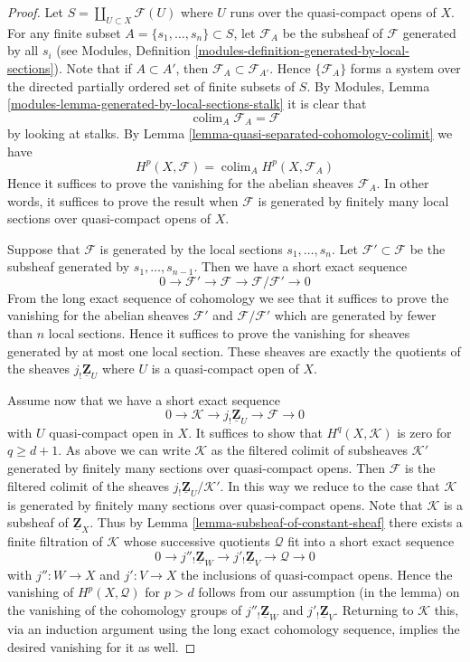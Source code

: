 \documentclass[10pt,a4paper]{amsart}
\theoremstyle{plain}
\theoremstyle{definition}
\theoremstyle{remark}
\numberwithin{equation}{subsection}
\def\colim{\mathop{\mathrm{colim}}\nolimits}
\begin{document}
\begin{proof}
Let $S = \coprod_{U \subset X} \mathcal{F}(U)$ where $U$ runs over the
quasi-compact opens of $X$.
For any finite subset $A = \{s_1, \ldots, s_n\} \subset S$,
let $\mathcal{F}_A$ be the subsheaf of $\mathcal{F}$ generated
by all $s_i$ (see
Modules, Definition \ref{modules-definition-generated-by-local-sections}).
Note that if $A \subset A'$, then $\mathcal{F}_A \subset \mathcal{F}_{A'}$.
Hence $\{\mathcal{F}_A\}$ forms a system over the
directed partially ordered set of finite subsets of $S$.
By Modules, Lemma \ref{modules-lemma-generated-by-local-sections-stalk}
it is clear that
$$
\colim_A \mathcal{F}_A = \mathcal{F}
$$
by looking at stalks. By
Lemma \ref{lemma-quasi-separated-cohomology-colimit} we have
$$
H^p(X, \mathcal{F}) =
\colim_A H^p(X, \mathcal{F}_A)
$$
Hence it suffices to prove the vanishing for the abelian sheaves
$\mathcal{F}_A$. In other words, it suffices to prove the
result when $\mathcal{F}$ is generated by finitely many local sections
over quasi-compact opens of $X$.

\medskip\noindent
Suppose that $\mathcal{F}$ is generated by the local sections
$s_1, \ldots, s_n$. Let $\mathcal{F}' \subset \mathcal{F}$
be the subsheaf generated by $s_1, \ldots, s_{n - 1}$.
Then we have a short exact sequence
$$
0 \to \mathcal{F}' \to \mathcal{F} \to \mathcal{F}/\mathcal{F}' \to 0
$$
From the long exact sequence of cohomology we see that it suffices
to prove the vanishing for the abelian sheaves $\mathcal{F}'$
and $\mathcal{F}/\mathcal{F}'$ which are generated by fewer than
$n$ local sections. Hence it suffices to prove the vanishing
for sheaves generated by at most one local section. These sheaves
are exactly the quotients of the sheaves $j_!\underline{\mathbf{Z}}_U$
where $U$ is a quasi-compact open of $X$.

\medskip\noindent
Assume now that we have a short exact sequence
$$
0 \to \mathcal{K} \to j_!\underline{\mathbf{Z}}_U \to \mathcal{F} \to 0
$$
with $U$ quasi-compact open in $X$.
It suffices to show that $H^q(X, \mathcal{K})$ is zero for $q \geq d + 1$.
As above we can write $\mathcal{K}$ as the filtered colimit of
subsheaves $\mathcal{K}'$ generated by finitely many sections over
quasi-compact opens. Then $\mathcal{F}$ is the filtered colimit of the
sheaves $j_!\underline{\mathbf{Z}}_U/\mathcal{K}'$. In this way we
reduce to the case that $\mathcal{K}$ is generated by finitely many
sections over quasi-compact opens. Note that $\mathcal{K}$
is a subsheaf of $\underline{\mathbf{Z}}_X$. Thus by
Lemma \ref{lemma-subsheaf-of-constant-sheaf} there exists a finite
filtration of $\mathcal{K}$ whose successive quotients $\mathcal{Q}$ fit
into a short exact sequence
$$
0 \to j''_!\underline{\mathbf{Z}}_W \to
j'_!\underline{\mathbf{Z}}_V \to \mathcal{Q} \to 0
$$
with $j'' : W \to X$ and $j' : V \to X$ the inclusions of quasi-compact opens.
Hence the vanishing of $H^p(X, \mathcal{Q})$ for $p > d$ follows
from our assumption (in the lemma) on the vanishing of the cohomology groups
of $j''_!\underline{\mathbf{Z}}_W$ and $j'_!\underline{\mathbf{Z}}_V$.
Returning to $\mathcal{K}$ this, via an induction argument using the
long exact cohomology sequence, implies the desired vanishing for it as well.
\end{proof}
\end{document}
